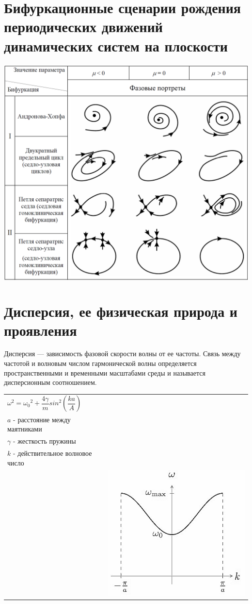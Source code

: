 \begin{multicols*}{2}
		\section{Бифуркационные сценарии рождения периодических движений динамических систем на плоскости}
		\includegraphics[width=0.75\linewidth]{tk_img/bifurk.png}

		\section{Дисперсия, ее физическая природа и проявления}
		Дисперсия — зависимость фазовой скорости волны от ее частоты. Связь между частотой и волновым числом гармонической волны определяется пространственными и временными масштабами среды и называется дисперсионным соотношением.\\

		\begin{tabular}{|l|c|}
			$\omega^2 = {\omega_0}^2 + \dfrac{4\gamma }{m}sin^2(\dfrac{ka}{A})$\\
			$a$ - расстояние между маятниками\\ $\gamma$ - жесткость пружины\\ $k$ - действительное волновое число\\ & \includegraphics[width=0.45\linewidth]{tk_img/dispers.png}\\
		\end{tabular}
		

\end{multicols*}
